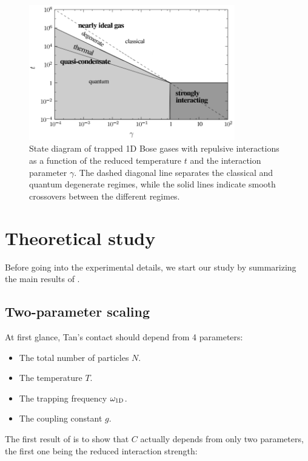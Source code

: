 \begin{figure}
    \centering
    \includegraphics[width=0.8\textwidth]{Fig/Chapter5/quant_degeneracy_1D_trapped.PNG}
    \caption{State diagram of trapped 1D Bose gases with repulsive interactions as a function of the reduced temperature $t$ and the interaction parameter $\gamma$. The dashed diagonal line separates the classical and quantum degenerate regimes, while the solid lines indicate smooth crossovers between the different regimes.}
    \label{fig:1D_diagram}
\end{figure}


\section{Theoretical study}

\label{sec:1D_theory}

Before going into the experimental details, we start our study by summarizing the main results of \cite{yao2018tan}.

\subsection{Two-parameter scaling}

At first glance, Tan's contact should depend from 4 parameters:

\begin{itemize}
    \item The total number of particles $N$.
    \item The temperature $T$.
    \item The trapping frequency $\omega_{\rm{1D}}$.
    \item The coupling constant $g$.
\end{itemize}

\noindent The first result of \cite{yao2018tan} is to show that $C$ actually depends from only two parameters, the first one being the reduced interaction strength:

